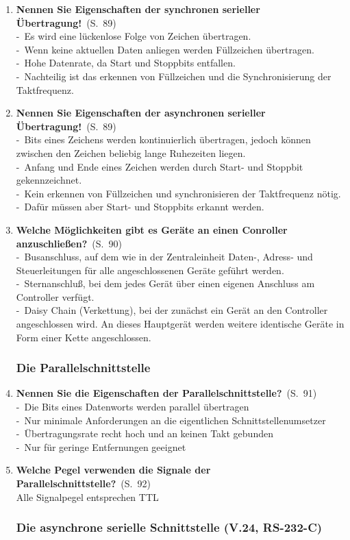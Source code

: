 \documentclass[a4paper,12pt]{article}
\newcommand{\question}[3]{\pagebreak[3]\item {\textbf{#1?}}\ (S.\ #2)#3}
\newcommand{\statement}[3]{\pagebreak[3]\item {\textbf{#1!}}\ (S.\ #2)#3}
\newcommand{\catchword}[1]{\\-\ #1}
\newcommand{\normaltext}[1]{\\#1}
\newcommand{\page}[1]{#1}
\begin{document}
\begin{enumerate}
  \statement{Nennen Sie Eigenschaften der synchronen serieller Übertragung}{\page{89}}
  {
    \catchword{Es wird eine lückenlose Folge von Zeichen übertragen.}
    \catchword{Wenn keine aktuellen Daten anliegen werden Füllzeichen übertragen.}
    \catchword{Hohe Datenrate, da Start und Stoppbits entfallen.}
    \catchword{Nachteilig ist das erkennen von Füllzeichen und die Synchronisierung der Taktfrequenz.}
  }

  \statement{Nennen Sie Eigenschaften der asynchronen serieller Übertragung}{\page{89}}
  {
    \catchword{Bits eines Zeichens werden kontinuierlich übertragen, jedoch können zwischen den Zeichen
               beliebig lange Ruhezeiten liegen.}
    \catchword{Anfang und Ende eines Zeichen werden durch Start- und Stoppbit gekennzeichnet.}
    \catchword{Kein erkennen von Füllzeichen und synchronisieren der Taktfrequenz nötig.}
    \catchword{Dafür müssen aber Start- und Stoppbits erkannt werden.}
  }

  \question{Welche Möglichkeiten gibt es Geräte an einen Conroller anzuschließen}{\page{90}}
  {
    \catchword{Busanschluss, auf dem wie in der Zentraleinheit Daten-, Adress- und Steuerleitungen
               für alle angeschlossenen Geräte geführt werden.}
    \catchword{Sternanschluß, bei dem jedes Gerät über einen eigenen Anschluss am Controller verfügt.}
    \catchword{Daisy Chain (Verkettung), bei der zunächst ein Gerät an den Controller angeschlossen wird.
               An dieses Hauptgerät werden weitere identische Geräte in Form einer Kette angeschlossen.}
  }

  \subsubsection{Die Parallelschnittstelle}

  \question{Nennen Sie die Eigenschaften der Parallelschnittstelle}{\page{91}}
  {
    \catchword{Die Bits eines Datenworts werden parallel übertragen}
    \catchword{Nur minimale Anforderungen an die eigentlichen Schnittstellenumsetzer}
    \catchword{Übertragungsrate recht hoch und an keinen Takt gebunden}
    \catchword{Nur für geringe Entfernungen geeignet}
  }

  \question{Welche Pegel verwenden die Signale der Parallelschnittstelle}{\page{92}}
  {
    \normaltext{Alle Signalpegel entsprechen TTL}
  }

  \subsubsection{Die asynchrone serielle Schnittstelle (V.24, RS-232-C)}


\end{enumerate}
\end{document}
